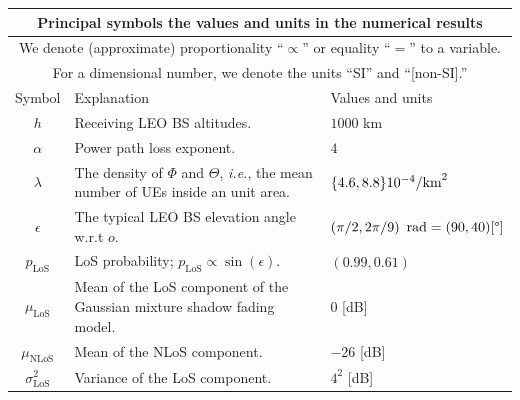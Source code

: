\documentclass[lettersize,journal]{IEEEtran}
\newcommand{\rEarth}{R_{\oplus}}
\newcommand{\R}{\mathbb{R}}
\begin{document}
\begin{table}
  \begin{center}
    \begin{tabular}{|c|p{4.5cm}|p{1.9cm}|}
      \multicolumn{3}{c}{\textbf{Principal symbols the values and units in the numerical results}} \\
      \toprule
      \multicolumn{3}{|c|}{\scriptsize{We denote (approximate) proportionality ``$\propto$'' or equality ``$=$'' to a variable.}} \\
      \multicolumn{3}{|c|}{\scriptsize{For a dimensional number, we denote the units ``SI'' and ``[non-SI].'' }} \\ 
      \hline
      Symbol& Explanation &Values and units
      \\ 
      \hline 
      $h$ & Receiving LEO BS altitudes. &$1000$ km  \\
      $\alpha$ &Power path loss exponent.& $4$\\
      $\lambda$ & The density of $\Phi$ and $\Theta$, \textit{i.e.}, the mean number of UEs inside an unit area.&$\{4.6,8.8\}\break10^{-4}\text{/km}^2$\\
      $\epsilon$& The typical LEO BS elevation angle w.r.t $\textit{o}$.&$\left({\pi}/{2},{2\pi}/{9}\right)\text{ rad}\break=(90,40)[\degree]$\\
      $p_{\text{LoS}}$& LoS probability; $p_{\text{LoS}} \propto \sin(\epsilon)$. & $(0.99,0.61)$\\
      $\mu_{\text{LoS}}$& Mean of the LoS component of the Gaussian mixture shadow fading model. & $0$ [dB] \\
      $\mu_{\text{NLoS}}$& Mean of the NLoS component. & $-26$ [dB] \\
      $\sigma^2_{\text{LoS}}$& Variance of the LoS component. & $4^2$ [dB] \\

\end{tabular}
\end{center}
\end{table}
\end{document}
